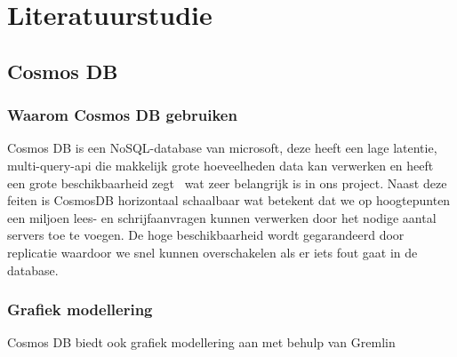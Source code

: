 \section{Literatuurstudie}%
\label{sec:literatuurstudie}

\subsection{Cosmos DB}%
\subsubsection{Waarom Cosmos DB gebruiken}
Cosmos DB is een NoSQL-database van microsoft, deze heeft een lage latentie, multi-query-api die makkelijk grote hoeveelheden data kan verwerken en heeft een grote beschikbaarheid zegt~\textcite{Put2020} wat zeer belangrijk is in ons project.
Naast deze feiten is CosmosDB horizontaal schaalbaar wat betekent dat we op hoogtepunten een miljoen lees- en schrijfaanvragen kunnen verwerken door het nodige aantal servers toe te voegen.
De hoge beschikbaarheid wordt gegarandeerd door replicatie waardoor we snel kunnen overschakelen als er iets fout gaat in de database.

\subsubsection{Grafiek modellering}
Cosmos DB biedt ook grafiek modellering aan met behulp van Gremlin








